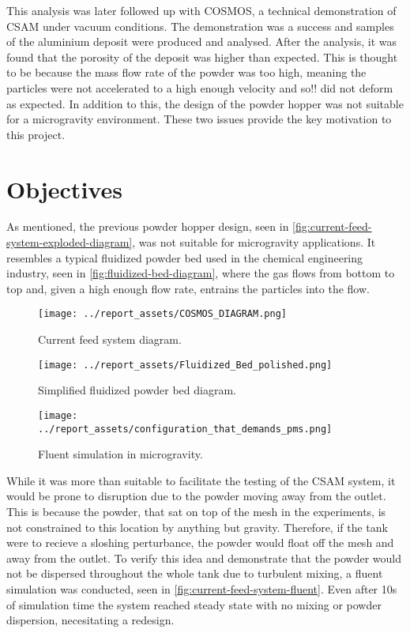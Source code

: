 This analysis was later followed up with COSMOS, a technical demonstration of CSAM under vacuum conditions. The demonstration was a success and samples of the aluminium deposit were produced and analysed. After the analysis, it was found that the porosity of the deposit was higher than expected. This is thought to be because the mass flow rate of the powder was too high, meaning the particles were not accelerated to a high enough velocity and so!! did not deform as expected. In addition to this, the design of the powder hopper was not suitable for a microgravity environment. These two issues provide the key motivation to this project.

\newpage

\section{Objectives}
As mentioned, the previous powder hopper design, seen in \autoref{fig:current-feed-system-exploded-diagram}, was not suitable for microgravity applications. It resembles a typical fluidized powder bed used in the chemical engineering industry, seen in \autoref{fig:fluidized-bed-diagram}, where the gas flows from bottom to top and, given a high enough flow rate, entrains the particles into the flow.
\begin{figure}[htbp]
    \centering

    \begin{minipage}{0.3\textwidth}
        \centering
        \texttt{[image: ../report\_assets/COSMOS\_DIAGRAM.png]}
        \caption{Current feed system diagram.}\label{fig:current-feed-system-exploded-diagram}
    \end{minipage}
    \hfill
    \begin{minipage}{0.3\textwidth}
        \centering
        \texttt{[image: ../report\_assets/Fluidized\_Bed\_polished.png]}
        \caption{Simplified fluidized powder bed diagram.}\label{fig:fluidized-bed-diagram}
    \end{minipage}
    \hfill
    \begin{minipage}{0.3\textwidth}
        \centering
        \texttt{[image: ../report\_assets/configuration\_that\_demands\_pms.png]}
        \caption{Fluent simulation in microgravity.}\label{fig:current-feed-system-fluent}
    \end{minipage}

\end{figure}

While it was more than suitable to facilitate the testing of the CSAM system, it would be prone to disruption due to the powder moving away from the outlet. This is because the powder, that sat on top of the mesh in the experiments, is not constrained to this location by anything but gravity. Therefore, if the tank were to recieve a sloshing perturbance, the powder would float off the mesh and away from the outlet. To verify this idea and demonstrate that the powder would not be dispersed throughout the whole tank due to turbulent mixing, a fluent simulation was conducted, seen in \autoref{fig:current-feed-system-fluent}. Even after 10s of simulation time the system reached steady state with no mixing or powder dispersion, necesitating a redesign.

